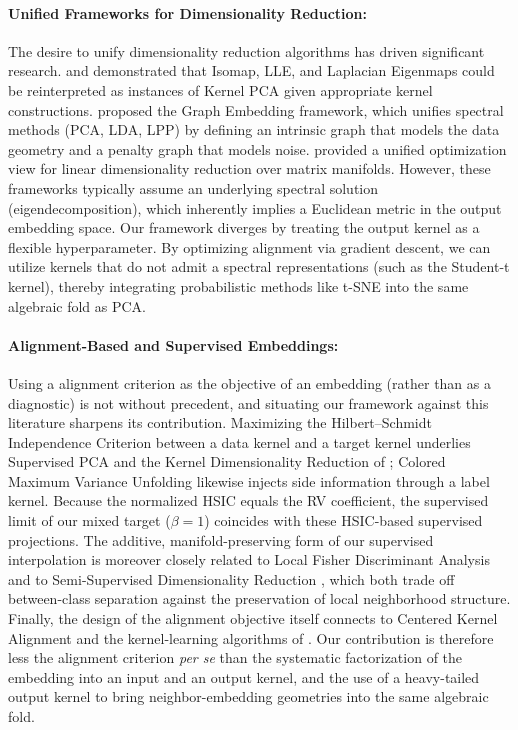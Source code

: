 \documentclass[11pt]{article}
\begin{document}
	\paragraph{Unified Frameworks for Dimensionality Reduction:} The desire to unify dimensionality reduction algorithms has driven significant research. \citet{ham_kernel_2004} and \citet{scholkopf_nonlinear_1998} demonstrated that Isomap, LLE, and Laplacian Eigenmaps could be reinterpreted as instances of Kernel PCA given appropriate kernel constructions. \citet{yan_graph_2007} proposed the Graph Embedding framework, which unifies spectral methods (PCA, LDA, LPP) by defining an intrinsic graph that models the data geometry and a penalty graph that models noise. \citet{cunningham_linear_2015} provided a unified optimization view for linear dimensionality reduction over matrix manifolds. However, these frameworks typically assume an underlying spectral solution (eigendecomposition), which inherently implies a Euclidean metric in the output embedding space. Our framework diverges by treating the output kernel as a flexible hyperparameter. By optimizing alignment via gradient descent, we can utilize kernels that do not admit a spectral representations (such as the Student-t kernel), thereby integrating probabilistic methods like t-SNE into the same algebraic fold as PCA.
	
	\paragraph{Alignment-Based and Supervised Embeddings:} Using a alignment criterion as the objective of an embedding (rather than as a diagnostic) is not without precedent, and situating our framework against this literature sharpens its contribution. Maximizing the Hilbert--Schmidt Independence Criterion between a data kernel and a target kernel underlies Supervised PCA \citep{barshan_supervised_2011} and the Kernel Dimensionality Reduction of \citet{fukumizu_dimensionality_2004}; Colored Maximum Variance Unfolding \citep{song_colored_2007} likewise injects side information through a label kernel. Because the normalized HSIC equals the RV coefficient, the supervised limit of our mixed target ($\beta=1$) coincides with these HSIC-based supervised projections. The additive, manifold-preserving form of our supervised interpolation is moreover closely related to Local Fisher Discriminant Analysis \citep{sugiyama_dimensionality_2007} and to Semi-Supervised Dimensionality Reduction \citep{zhang_semisupervised_2007}, which both trade off between-class separation against the preservation of local neighborhood structure. Finally, the design of the alignment objective itself connects to Centered Kernel Alignment and the kernel-learning algorithms of \citet{cortes_algorithms_2012}. Our contribution is therefore less the alignment criterion \emph{per se} than the systematic factorization of the embedding into an input and an output kernel, and the use of a heavy-tailed output kernel to bring neighbor-embedding geometries into the same algebraic fold.
	
\end{document}
